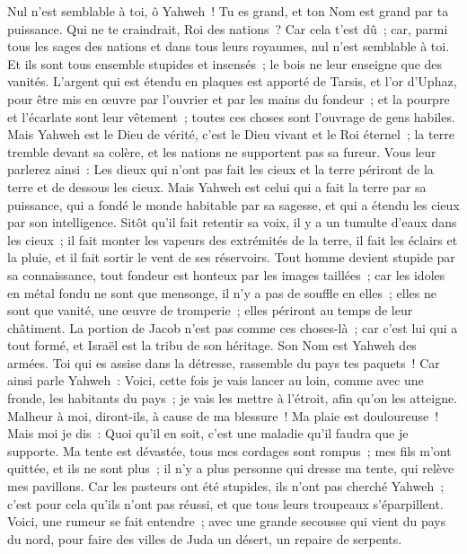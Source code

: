\begin{multicols}{2}
Nul n'est semblable à toi, ô Yahweh~! Tu es grand, et ton Nom est grand par ta puissance.
Qui ne te craindrait, Roi des nations~? Car cela t'est dû~; car, parmi tous les sages des nations et dans tous leurs royaumes, nul n'est semblable à toi.
Et ils sont tous ensemble stupides et insensés~; le bois ne leur enseigne que des vanités.
L'argent qui est étendu en plaques est apporté de Tarsis, et l'or d'Uphaz, pour être mis en œuvre par l'ouvrier et par les mains du fondeur~; et la pourpre et l'écarlate sont leur vêtement~; toutes ces choses sont l'ouvrage de gens habiles.
Mais Yahweh est le Dieu de vérité, c'est le Dieu vivant et le Roi éternel~; la terre tremble devant sa colère, et les nations ne supportent pas sa fureur.
Vous leur parlerez ainsi~: Les dieux qui n'ont pas fait les cieux et la terre périront de la terre et de dessous les cieux.
Mais Yahweh est celui qui a fait la terre par sa puissance, qui a fondé le monde habitable par sa sagesse, et qui a étendu les cieux par son intelligence.
Sitôt qu'il fait retentir sa voix, il y a un tumulte d'eaux dans les cieux~; il fait monter les vapeurs des extrémités de la terre, il fait les éclairs et la pluie, et il fait sortir le vent de ses réservoirs.
Tout homme devient stupide par sa connaissance, tout fondeur est honteux par les images taillées~; car les idoles en métal fondu ne sont que mensonge, il n'y a pas de souffle en elles~;
elles ne sont que vanité, une œuvre de tromperie~; elles périront au temps de leur châtiment.
La portion de Jacob n'est pas comme ces choses-là~; car c'est lui qui a tout formé, et Israël est la tribu de son héritage. Son Nom est Yahweh des armées.
Toi qui es assise dans la détresse, rassemble du pays tes paquets~!
Car ainsi parle Yahweh~: Voici, cette fois je vais lancer au loin, comme avec une fronde, les habitants du pays~; je vais les mettre à l'étroit, afin qu'on les atteigne.
Malheur à moi, diront-ils, à cause de ma blessure~! Ma plaie est douloureuse~! Mais moi je dis~: Quoi qu'il en soit, c'est une maladie qu'il faudra que je supporte.
Ma tente est dévastée, tous mes cordages sont rompus~; mes fils m'ont quittée, et ils ne sont plus~; il n'y a plus personne qui dresse ma tente, qui relève mes pavillons.
Car les pasteurs ont été stupides, ils n'ont pas cherché Yahweh~; c'est pour cela qu'ils n'ont pas réussi, et que tous leurs troupeaux s'éparpillent.
Voici, une rumeur se fait entendre~; avec une grande secousse qui vient du pays du nord, pour faire des villes de Juda un désert, un repaire de serpents.

\end{multicols}
